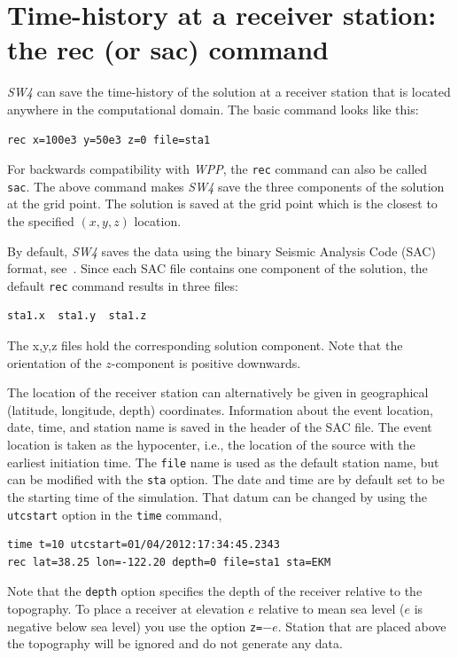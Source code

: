 \documentclass[11pt]{report}
\begin{document}
{%
\section{Time-history at a receiver station: the rec (or sac) command}\label{sec:rec}

\emph{SW4} can save the time-history of the solution at a receiver station that is located anywhere
in the computational domain. The basic command looks like this:
\begin{verbatim}
rec x=100e3 y=50e3 z=0 file=sta1
\end{verbatim}
For backwards compatibility with \emph{WPP}, the \verb+rec+ command can also be called \verb+sac+.
The above command makes \emph{SW4} save the three components of the solution at the grid point. The
solution is saved at the grid point which is the closest to the specified $(x,y,z)$ location.

By default, \emph{SW4} saves the data using the binary Seismic Analysis Code (SAC) format,
see~\cite{Goldstein-et-al}. Since each SAC file contains one component of the solution, the default
\verb+rec+ command results in three files:
\begin{verbatim}
sta1.x  sta1.y  sta1.z
\end{verbatim}
The x,y,z files hold the corresponding solution component. Note that the orientation of the
$z$-component is positive downwards.

The location of the receiver station can alternatively be given in geographical (latitude,
longitude, depth) coordinates. Information about the event location, date, time, and station name is
saved in the header of the SAC file. The event location is taken as the hypocenter, i.e., the
location of the source with the earliest initiation time. The \verb+file+ name is used as the
default station name, but can be modified with the \verb+sta+ option. The date and time are by
default set to be the starting time of the simulation. That datum can be changed by using the
\verb+utcstart+ option in the \verb+time+ command,
%
\begin{verbatim}
time t=10 utcstart=01/04/2012:17:34:45.2343
rec lat=38.25 lon=-122.20 depth=0 file=sta1 sta=EKM
\end{verbatim}
Note that the \verb+depth+ option specifies the depth of the receiver relative to the topography. To
place a receiver at elevation $e$ relative to mean sea level ($e$ is negative below sea level) you
use the option {\tt z=}$-e$. Station that are placed above the topography will be ignored and do not
generate any data.

}
\end{document}
